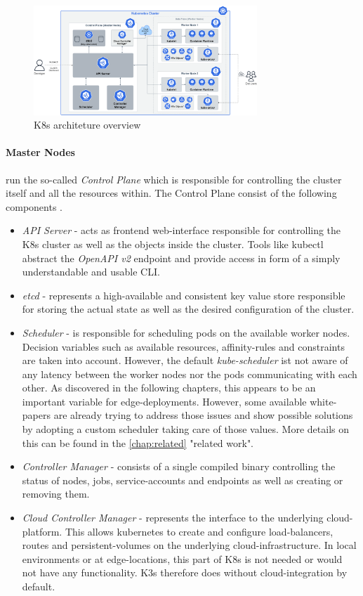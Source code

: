 \documentclass[MSC,Master,english]{twbook}%
\begin{document}
\begin{figure}[ht]
    \centering
    \includegraphics[width=0.75\textwidth]{PICs/k8s-architecture.png}
    \caption{\ac{K8s} architeture overview\cite{pic-k8s-overview}}
    \label{fig:k8s-architecture}
\end{figure}

\paragraph{Master Nodes} run the so-called \textit{Control Plane} which is responsible for controlling the cluster itself and all the resources within. The Control Plane consist of the following components \cite{k8scomp}.
\begin{itemize}
    \item \textit{API Server} - acts as frontend web-interface responsible for controlling the \ac{K8s} cluster as well as the objects inside the cluster. Tools like kubectl abstract the \textit{OpenAPI v2} endpoint and provide access in form of a simply understandable and usable \ac{CLI}. 
    \item \textit{etcd} - represents a high-available and consistent key value store responsible for storing the actual state as well as the desired configuration of the cluster.
    \item \textit{Scheduler} - is responsible for scheduling pods on the available worker nodes. Decision variables such as available resources, affinity-rules and constraints are taken into account. However, the default \textit{kube-scheduler} ist not aware of any latency between the worker nodes nor the pods communicating with each other. As discovered in the following chapters, this appears to be an important variable for edge-deployments. However, some available white-papers are already trying to address those issues and show possible solutions by adopting a custom scheduler taking care of those values. More details on this can be found in the \autoref{chap:related} "related work".
    \item \textit{Controller Manager} - consists of a single compiled binary controlling the status of nodes, jobs, service-accounts and endpoints as well as creating or removing them.
    \item \textit{Cloud Controller Manager} - represents the interface to the underlying cloud-platform. This allows kubernetes to create and configure load-balancers, routes and persistent-volumes on the underlying cloud-infrastructure. In local environments or at edge-locations, this part of \ac{K8s} is not needed or would not have any functionality. K3s therefore does without cloud-integration by default\cite{minikube}.
\end{itemize}
\end{document}

